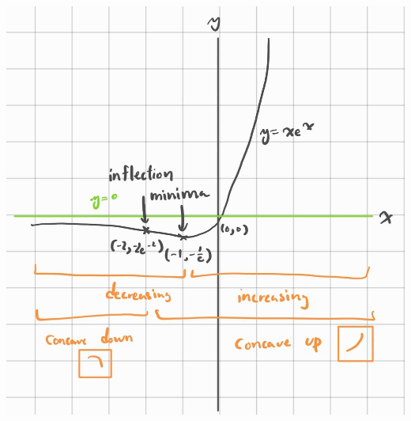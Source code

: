 \documentclass{article}
\begin{document}
\begin{minipage}{0.3\textwidth}
    \includegraphics[width=\textwidth]{A2Q8.jpg}
\end{minipage}
\end{document}
